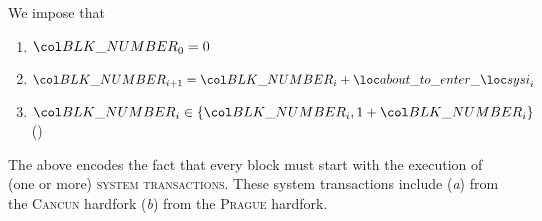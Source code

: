 We impose that
\begin{enumerate}
        \item $\blockNumber _{0} = 0$
	\item $\blockNumber _{i + 1} = \blockNumber _{i} + \aboutToEnterSystemInit _{i}$
	\item $\blockNumber _{i} \in \{ \blockNumber _{i}, 1 + \blockNumber _{i} \}$ (\sanityCheck)
\end{enumerate}
\saNote{} \label{hub: system: system flags: block number increments and initial system transactions}
The above encodes the fact that every block must start with the execution of (one or more) \textsc{system transactions}.
These system transactions include
(\emph{a}) \cite{EIP-4788} from the \textsc{Cancun} hardfork
(\emph{b}) \cite{EIP-2935} from the \textsc{Prague} hardfork.
